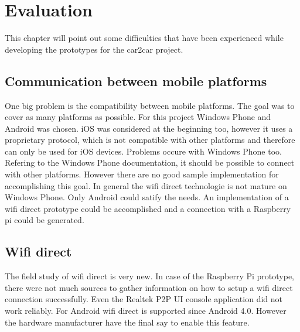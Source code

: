 \chapter{Evaluation}
\label{cha:Evaluation}
This chapter will point out some difficulties that have been experienced while developing the prototypes for the car2car project.

\section{Communication between mobile platforms}
\label{sec:CommunicationBetweenPlattforms}
One big problem is the compatibility between mobile platforms. The goal was to cover as many platforms as possible. For this project Windows Phone and Android was chosen. iOS was considered at the beginning too, however it uses a proprietary protocol, which is not compatible with other platforms and therefore can only be used for iOS devices. Problems occure with Windows Phone too. Refering to the Windows Phone documentation, it should be possible to connect with other platforms. However there are no good sample implementation for accomplishing this goal. In general the wifi direct technologie is not mature on Windows Phone. Only Android could satify the needs. An implementation of a wifi direct prototype could be accomplished and a connection with a Raspberry pi could be generated.

\section{Wifi direct}
\label{sec:WifiDirect}
The field study of wifi direct is very new. In case of the Raspberry Pi prototype, there were not much sources to gather information on how to setup a wifi direct connection successfully. Even the Realtek P2P UI console application did not work reliably. For Android wifi direct is supported since Android 4.0. However the hardware manufacturer have the final say to enable this feature. 

